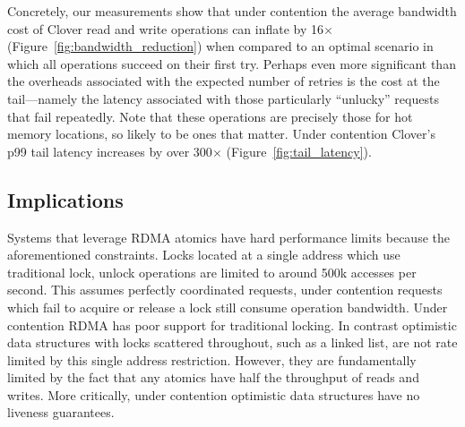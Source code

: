 Concretely,
our measurements show that under contention the
average bandwidth cost of Clover read and write operations can inflate
by 16$\times$ (Figure~\ref{fig:bandwidth_reduction}) when compared
to an optimal scenario in which all operations succeed on their first
try.
%
%
Perhaps even more significant than the overheads associated with the expected
number of retries is the cost at the tail---namely the latency associated with
those particularly ``unlucky'' requests that fail repeatedly.  Note that these
operations are precisely those for hot memory locations, so likely to be
ones that matter.  Under contention
Clover's p99 tail latency increases by
over 300$\times$ (Figure~\ref{fig:tail_latency}).%



\subsection{Implications}

Systems that leverage RDMA atomics have hard performance
limits because the aforementioned constraints.  Locks
located at a single address which use traditional lock,
unlock operations are limited to around 500k accesses per
second. This assumes perfectly coordinated requests, under
contention requests which fail to acquire or release a lock
still consume operation bandwidth.
Under contention RDMA has poor support for traditional
locking. In contrast optimistic data structures with locks
scattered throughout, such as a linked list, are not rate
limited by this single address restriction.  However, they
are fundamentally limited by the fact that any atomics have
half the throughput of reads and writes. More critically,
under contention optimistic data structures have no liveness
guarantees.


